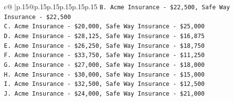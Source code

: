 \documentclass{article}
\begin{document}
{\begin{supertabular}{c@{$\;$}|p{.15\linewidth}@{}p{.15\linewidth}p{.15\linewidth}p{.15\linewidth}p{.15\linewidth}p{.15\linewidth}}
{{{\texttt{B. Acme Insurance {-} \$22,500, Safe Way Insurance {-} \$22,500} \\
\texttt{C. Acme Insurance {-} \$20,000, Safe Way Insurance {-} \$25,000} \\
\texttt{D. Acme Insurance {-} \$28,125, Safe Way Insurance {-} \$16,875} \\
\texttt{E. Acme Insurance {-} \$26,250, Safe Way Insurance {-} \$18,750} \\
\texttt{F. Acme Insurance {-} \$33,750, Safe Way Insurance {-} \$11,250} \\
\texttt{G. Acme Insurance {-} \$27,000, Safe Way Insurance {-} \$18,000} \\
\texttt{H. Acme Insurance {-} \$30,000, Safe Way Insurance {-} \$15,000} \\
\texttt{I. Acme Insurance {-} \$32,500, Safe Way Insurance {-} \$12,500} \\
\texttt{J. Acme Insurance {-} \$24,000, Safe Way Insurance {-} \$21,000} \\
            }
        }
    }
     \\ \\


\end{supertabular}}
\end{document}
